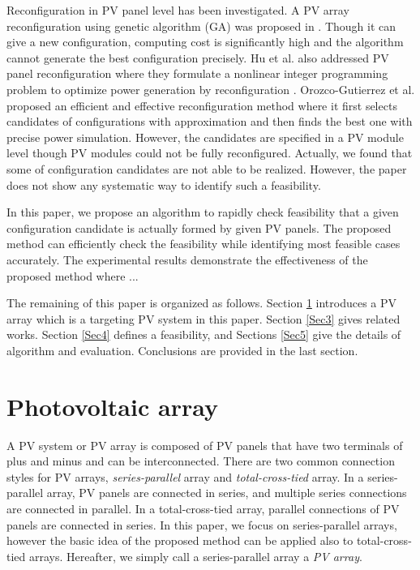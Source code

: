 \documentclass[conference]{IEEEtran}
\begin{document}
Reconfiguration in PV panel level has been investigated\cite{carotenuto2015evolutionary,hu2017non,orozco2016optimized}. 
A PV array reconfiguration using genetic algorithm (GA) was proposed in \cite{carotenuto2015evolutionary}. Though it can give a new configuration, computing cost is significantly high and the algorithm cannot generate the best configuration precisely.  
Hu et al. also addressed PV panel reconfiguration where they formulate a nonlinear integer programming problem to optimize power generation by reconfiguration \cite{hu2017non}.
Orozco-Gutierrez et al. proposed an efficient and effective reconfiguration method\cite{orozco2016optimized} where it first selects candidates of configurations with approximation and then finds the best one with precise power simulation. However, the candidates are specified in a PV module level though PV modules could not be fully reconfigured. Actually, we found that some of configuration candidates are not able to be realized. However, the paper\cite{orozco2016optimized}  does not show any systematic way to identify such a feasibility. 

In this paper, we propose an algorithm to rapidly check feasibility that a given configuration candidate is actually formed by given PV panels. The proposed method can efficiently check the feasibility while identifying most feasible cases accurately. The experimental results demonstrate the effectiveness of the proposed method where ...

The remaining of this paper is organized as follows. Section \ref{Sec2} introduces a PV array which is a targeting PV system in this paper. Section \ref{Sec3} gives related works. Section \ref{Sec4} defines a feasibility, and Sections \ref{Sec5} give the details of algorithm and evaluation. 
Conclusions are provided in the last section.

\section{Photovoltaic array}\label{Sec2}
A PV system or PV array is composed of PV panels that have two terminals of plus and minus and can be interconnected. There are two common connection styles for PV arrays, \textit{series-parallel} array and \textit{total-cross-tied} array. 
In a series-parallel array, PV panels are connected in series, and multiple series connections are connected in parallel. In a total-cross-tied array, parallel connections of PV panels are connected in series. In this paper, we focus on series-parallel arrays, however the basic idea of the proposed method can be applied also to total-cross-tied arrays. Hereafter, we simply call a series-parallel array a \textit{PV array}. 
\end{document}
